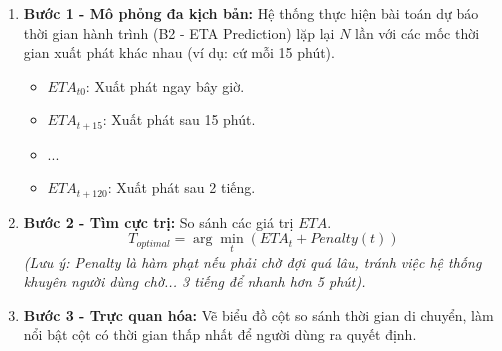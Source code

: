 \begin{enumerate}
    \item \textbf{Bước 1 - Mô phỏng đa kịch bản:} Hệ thống thực hiện bài toán dự báo thời gian hành trình (B2 - ETA Prediction) lặp lại $N$ lần với các mốc thời gian xuất phát khác nhau (ví dụ: cứ mỗi 15 phút).
    \begin{itemize}
        \item $ETA_{t0}$: Xuất phát ngay bây giờ.
        \item $ETA_{t+15}$: Xuất phát sau 15 phút.
        \item ...
        \item $ETA_{t+120}$: Xuất phát sau 2 tiếng.
    \end{itemize}
    \item \textbf{Bước 2 - Tìm cực trị:} So sánh các giá trị $ETA$.
    \[ T_{optimal} = \arg \min_{t} (ETA_t + Penalty(t)) \]
    \textit{(Lưu ý: Penalty là hàm phạt nếu phải chờ đợi quá lâu, tránh việc hệ thống khuyên người dùng chờ... 3 tiếng để nhanh hơn 5 phút).}
    \item \textbf{Bước 3 - Trực quan hóa:} Vẽ biểu đồ cột so sánh thời gian di chuyển, làm nổi bật cột có thời gian thấp nhất để người dùng ra quyết định.
\end{enumerate}
